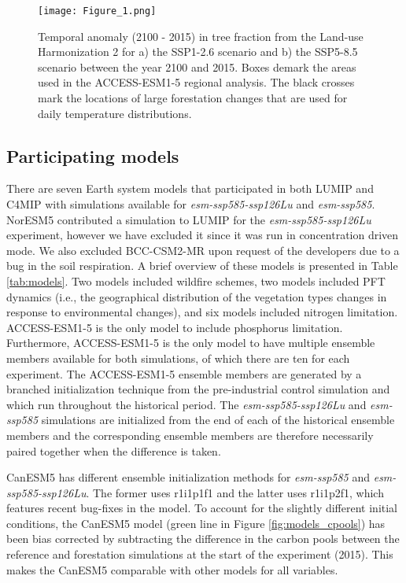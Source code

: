 \documentclass[draft]{agujournal2019}
\begin{document}
\begin{figure}
    \texttt{[image: Figure\_1.png]}
    \caption{Temporal anomaly (2100 - 2015) in tree fraction from the Land-use Harmonization 2 for a) the SSP1-2.6 scenario and b) the SSP5-8.5 scenario between the year 2100 and 2015. Boxes demark the areas used in the ACCESS-ESM1-5 regional analysis. The black crosses mark the locations of large forestation changes that are used for daily temperature distributions.}
    \label{fig:land_use}
\end{figure}

\subsection{Participating models}

There are seven Earth system models that participated in both LUMIP and C4MIP with simulations available for \textit{esm-ssp585-ssp126Lu} and \textit{esm-ssp585}.
NorESM5 contributed a simulation to LUMIP for the \textit{esm-ssp585-ssp126Lu} experiment, however we have excluded it since it was run in concentration driven mode.
We also excluded BCC-CSM2-MR upon request of the developers due to a bug in the soil respiration.
A brief overview of these models is presented in Table \ref{tab:models}.
Two models included wildfire schemes, two models included PFT dynamics (i.e., the geographical distribution of the vegetation types changes in response to environmental changes), and six models included nitrogen limitation.
ACCESS-ESM1-5 is the only model to include phosphorus limitation.
Furthermore, ACCESS-ESM1-5 is the only model to have multiple ensemble members available for both simulations, of which there are ten for each experiment.
The ACCESS-ESM1-5 ensemble members are generated by a branched initialization technique from the pre-industrial control simulation and which run throughout the historical period.
The \textit{esm-ssp585-ssp126Lu} and \textit{esm-ssp585} simulations are initialized from the end of each of the historical ensemble members and the corresponding ensemble members are therefore necessarily paired together when the difference is taken.

CanESM5 has different ensemble initialization methods for \textit{esm-ssp585} and \textit{esm-ssp585-ssp126Lu}.
The former uses r1i1p1f1 and the latter uses r1i1p2f1, which features recent bug-fixes in the model.
To account for the slightly different initial conditions, the CanESM5 model (green line in Figure \ref{fig:models_cpools}) has been bias corrected by subtracting the difference in the carbon pools between the reference and forestation simulations at the start of the experiment (2015).
This makes the CanESM5 comparable with other models for all variables.
\end{document}
